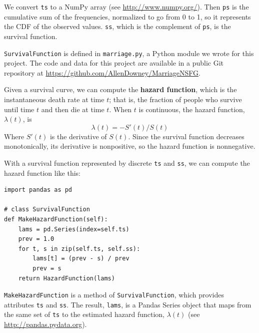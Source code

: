 \documentclass[journal]{IEEEtran}
\begin{document}
We convert {\tt ts} to a NumPy array (see \url{http://www.numpy.org/}).
Then {\tt ps} is the cumulative sum of
the frequencies, normalized to go from 0 to 1, so it represents
the CDF of the observed values.  {\tt ss}, which is the complement
of {\tt ps}, is the survival function.

{\tt SurvivalFunction} is defined in {\tt marriage.py},
a Python module we wrote for this project.  The code and data for this
project are available in a public Git repository at
\url{https://github.com/AllenDowney/MarriageNSFG}.

Given a survival curve, we can compute the {\bf hazard function},
which is the instantaneous death rate at time $t$; that is, the
fraction of people who survive until time $t$ and then die at time $t$.
When $t$ is continuous, the hazard function, $\lambda(t)$, is
%
\begin{equation}
\lambda(t) = -S'(t) / S(t)
\end{equation}
%
Where $S'(t)$ is the derivative of $S(t)$.  Since the survival
function decreases monotonically, its derivative is nonpositive,
so the hazard function is nonnegative.

With a survival function represented by discrete {\tt ts} and {\tt ss},
we can compute the hazard function like this:

\begin{verbatim}
import pandas as pd

# class SurvivalFunction
def MakeHazardFunction(self):
    lams = pd.Series(index=self.ts)
    prev = 1.0
    for t, s in zip(self.ts, self.ss):
        lams[t] = (prev - s) / prev
        prev = s
    return HazardFunction(lams)
\end{verbatim}

{\tt MakeHazardFunction} is a method of {\tt SurvivalFunction},
which provides attributes {\tt ts} and {\tt ss}.  The result,
{\tt lams}, is a Pandas Series object that maps from the
same set of {\tt ts} to the estimated hazard function, $\lambda(t)$
(see \url{http://pandas.pydata.org}).

\end{document}
